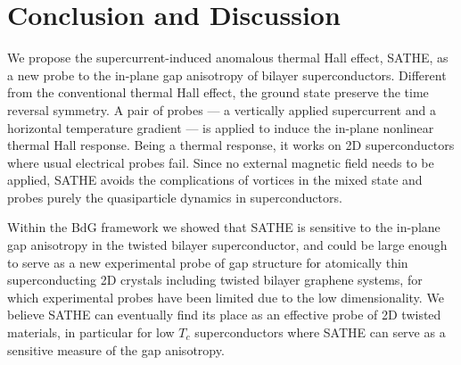\section{Conclusion and Discussion}
We propose the supercurrent-induced anomalous thermal Hall effect, SATHE, as a new probe to the in-plane gap anisotropy of bilayer superconductors. Different from the conventional thermal Hall effect, the ground state preserve the time reversal symmetry. A pair of probes --- a vertically applied supercurrent and a horizontal temperature gradient --- is applied to induce the in-plane nonlinear thermal Hall response. Being a thermal response, it works on 2D superconductors where usual electrical probes fail. Since no external magnetic field needs to be applied, SATHE avoids the complications of vortices in the mixed state and probes purely the quasiparticle dynamics in superconductors. 

Within the BdG framework we showed that SATHE is sensitive to the in-plane gap anisotropy in the twisted bilayer superconductor, and could be large enough to serve as a new experimental probe of gap structure for atomically thin superconducting 2D crystals including twisted bilayer graphene systems, for which experimental probes have been limited due to the low dimensionality. We believe SATHE can eventually find its place as an effective probe of 2D twisted materials, in particular for low $T_c$ superconductors where SATHE can serve as a sensitive measure of the gap anisotropy. 

